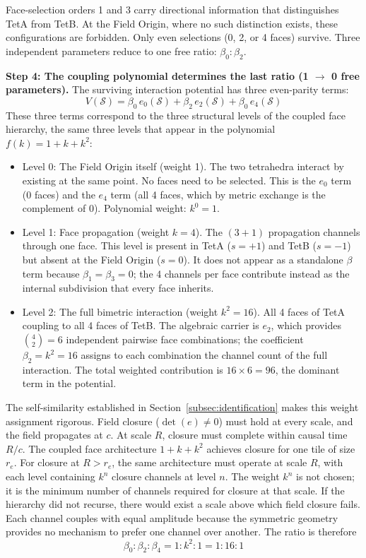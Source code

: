 \documentclass[aps,prd,preprint,superscriptaddress,showpacs,preprintnumbers,amsmath,amssymb,nofootinbib]{revtex4-2}
\begin{document}
Face-selection orders 1 and 3 carry directional information that distinguishes TetA from TetB. At the Field Origin, where no such distinction exists, these configurations are forbidden. Only even selections (0, 2, or 4 faces) survive. Three independent parameters reduce to one free ratio: $\beta_0 : \beta_2$.

\textbf{Step 4: The coupling polynomial determines the last ratio (1 $\to$ 0 free parameters).} The surviving interaction potential has three even-parity terms:
\begin{equation}
V(\mathcal{S}) = \beta_0\,e_0(\mathcal{S}) + \beta_2\,e_2(\mathcal{S}) + \beta_0\,e_4(\mathcal{S})
\end{equation}
These three terms correspond to the three structural levels of the coupled face hierarchy, the same three levels that appear in the polynomial $f(k) = 1 + k + k^2$:
\begin{itemize}
\item Level 0: The Field Origin itself (weight 1). The two tetrahedra interact by existing at the same point. No faces need to be selected. This is the $e_0$ term (0 faces) and the $e_4$ term (all 4 faces, which by metric exchange is the complement of 0). Polynomial weight: $k^0 = 1$.
\item Level 1: Face propagation (weight $k = 4$). The $(3{+}1)$ propagation channels through one face. This level is present in TetA ($s = +1$) and TetB ($s = -1$) but absent at the Field Origin ($s = 0$). It does not appear as a standalone $\beta$ term because $\beta_1 = \beta_3 = 0$; the 4 channels per face contribute instead as the internal subdivision that every face inherits.
\item Level 2: The full bimetric interaction (weight $k^2 = 16$). All 4 faces of TetA coupling to all 4 faces of TetB. The algebraic carrier is $e_2$, which provides $\binom{4}{2} = 6$ independent pairwise face combinations; the coefficient $\beta_2 = k^2 = 16$ assigns to each combination the channel count of the full interaction. The total weighted contribution is $16 \times 6 = 96$, the dominant term in the potential.
\end{itemize}

The self-similarity established in Section~\ref{subsec:identification} makes this weight assignment rigorous. Field closure ($\det(e) \neq 0$) must hold at every scale, and the field propagates at $c$. At scale $R$, closure must complete within causal time $R/c$. The coupled face architecture $1 + k + k^2$ achieves closure for one tile of size $r_e$. For closure at $R > r_e$, the same architecture must operate at scale $R$, with each level containing $k^n$ closure channels at level $n$. The weight $k^n$ is not chosen; it is the minimum number of channels required for closure at that scale. If the hierarchy did not recurse, there would exist a scale above which field closure fails. Each channel couples with equal amplitude because the symmetric geometry provides no mechanism to prefer one channel over another. The ratio is therefore
\begin{equation}
\beta_0 : \beta_2 : \beta_4 = 1 : k^2 : 1 = 1 : 16 : 1
\label{eq:beta-ratio}
\end{equation}
\end{document}
